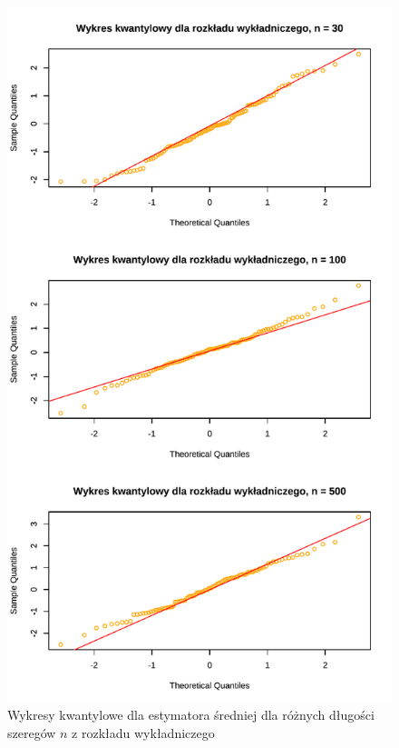 \documentclass[10pt, a4paper]{article}\usepackage[]{graphicx}\usepackage[]{xcolor}
\makeatletter
\def\maxwidth{ %
  \ifdim\Gin@nat@width>\linewidth
    \linewidth
  \else
    \Gin@nat@width
  \fi
}
\newenvironment{knitrout}{}{} %
\makeatother
\begin{document}
\begin{knitrout}
\color{fgcolor}\begin{figure}[H]

{\centering \includegraphics[width=\maxwidth]{figure/analiza-srednie-exp-wykresy-kwant-1} 

}

\caption[Wykresy kwantylowe dla estymatora średniej dla różnych długości szeregów $n$ z rozkładu wykładniczego]{Wykresy kwantylowe dla estymatora średniej dla różnych długości szeregów $n$ z rozkładu wykładniczego}\label{fig:analiza-srednie-exp-wykresy-kwant}
\end{figure}

\end{knitrout}
\end{document}
